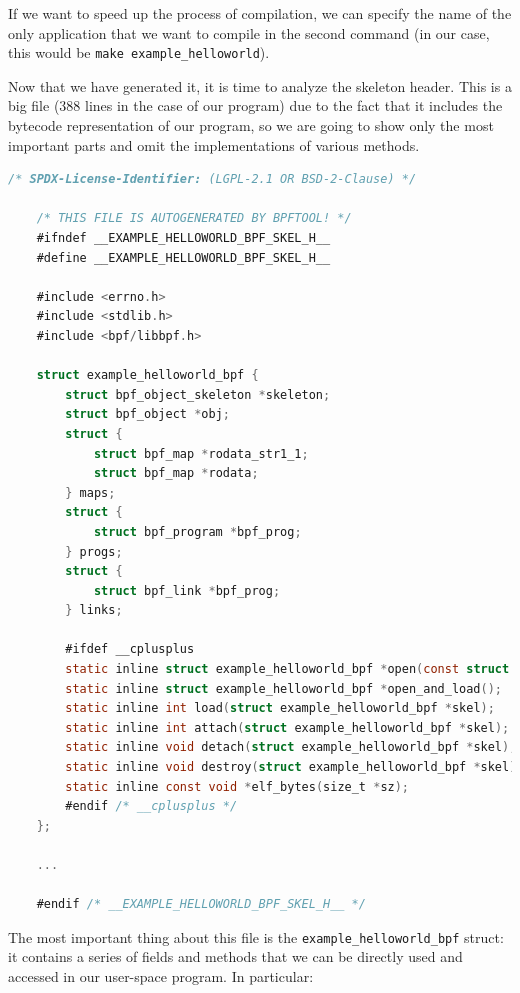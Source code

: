 If we want to speed up the process of compilation, we can specify the name of the only application that we want to compile in the second command (in our case, this would be \verb|make example_helloworld|).

Now that we have generated it, it is time to analyze the skeleton header.
This is a big file (388 lines in the case of our program) due to the fact that it includes the bytecode representation of our program, so we are going to show only the most important parts and omit the implementations of various methods.

\begin{lstlisting}[language=C, caption={``Hello world!'' skeleton file using libbpf-bootstrap}, title=example\_helloworld.skel.h]
	/* SPDX-License-Identifier: (LGPL-2.1 OR BSD-2-Clause) */
	
	/* THIS FILE IS AUTOGENERATED BY BPFTOOL! */
	#ifndef __EXAMPLE_HELLOWORLD_BPF_SKEL_H__
	#define __EXAMPLE_HELLOWORLD_BPF_SKEL_H__
	
	#include <errno.h>
	#include <stdlib.h>
	#include <bpf/libbpf.h>
	
	struct example_helloworld_bpf {
		struct bpf_object_skeleton *skeleton;
		struct bpf_object *obj;
		struct {
			struct bpf_map *rodata_str1_1;
			struct bpf_map *rodata;
		} maps;
		struct {
			struct bpf_program *bpf_prog;
		} progs;
		struct {
			struct bpf_link *bpf_prog;
		} links;
		
		#ifdef __cplusplus
		static inline struct example_helloworld_bpf *open(const struct bpf_object_open_opts *opts = nullptr);
		static inline struct example_helloworld_bpf *open_and_load();
		static inline int load(struct example_helloworld_bpf *skel);
		static inline int attach(struct example_helloworld_bpf *skel);
		static inline void detach(struct example_helloworld_bpf *skel);
		static inline void destroy(struct example_helloworld_bpf *skel);
		static inline const void *elf_bytes(size_t *sz);
		#endif /* __cplusplus */
	};
	
	...
	
	#endif /* __EXAMPLE_HELLOWORLD_BPF_SKEL_H__ */
\end{lstlisting}

The most important thing about this file is the \verb|example_helloworld_bpf| struct: it contains a series of fields and methods that we can be directly used and accessed in our user-space program.
In particular:

